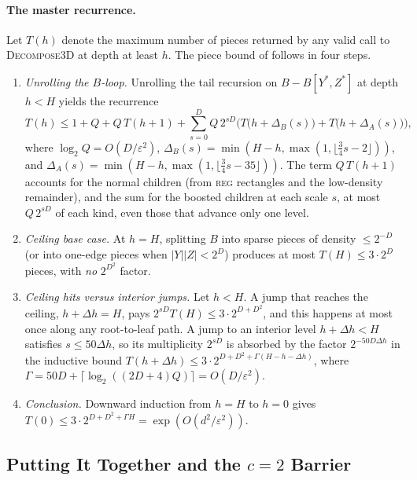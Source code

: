 \documentclass[11pt]{article}
\theoremstyle{definition}
\renewcommand{\label}[1]{}%
\newcommand{\abs}[1]{\left\lvert #1 \right\rvert}
\newcommand{\DecomposeThreeD}{\textnormal{\textsc{Decompose3D}}}
\newcommand{\tagreg}{\textnormal{\textsc{reg}}}
\begin{document}
\paragraph{The master recurrence.}
Let $T(h)$ denote the maximum number of pieces returned by any valid call to \DecomposeThreeD{} at depth at least $h$. The piece bound of  follows in four steps.
\begin{enumerate}[label=(\roman*), leftmargin=*]
    \item \emph{Unrolling the $B$-loop.} Unrolling the tail recursion on $B - B[Y^*, Z^*]$ at depth $h < H$ yields the recurrence
    \begin{equation}\label{eq:overview-recurrence}
        T(h) \le 1 + Q + Q\,T(h + 1) + \sum_{s=0}^{D} Q\,2^{s D}\Big(T\big(h + \Delta_B(s)\big) + T\big(h + \Delta_A(s)\big)\Big),
    \end{equation}
    where $\log_2 Q = O(D/\varepsilon^2)$, $\Delta_B(s) = \min(H-h, \max(1, \lfloor \frac{3}{4}s - 2 \rfloor))$, and $\Delta_A(s) = \min(H-h, \max(1, \lfloor \frac{3}{4}s - 35 \rfloor))$. The term $Q\,T(h+1)$ accounts for the normal children (from \tagreg{} rectangles and the low-density remainder), and the sum for the boosted children at each scale $s$, at most $Q\,2^{sD}$ of each kind, even those that advance only one level.
    \item \emph{Ceiling base case.} At $h = H$, splitting $B$ into sparse pieces of density $\le 2^{-D}$ (or into one-edge pieces when $\abs{Y}\abs{Z} < 2^D$) produces at most $T(H) \le 3 \cdot 2^D$ pieces, with \emph{no} $2^{D^2}$ factor.
    \item \emph{Ceiling hits versus interior jumps.} Let $h < H$. A jump that reaches the ceiling, $h + \Delta h = H$, pays $2^{s D} T(H) \le 3 \cdot 2^{D + D^2}$, and this happens at most once along any root-to-leaf path. A jump to an interior level $h + \Delta h < H$ satisfies $s \le 50\Delta h$, so its multiplicity $2^{s D}$ is absorbed by the factor $2^{-50 D \Delta h}$ in the inductive bound $T(h + \Delta h) \le 3 \cdot 2^{D + D^2 + \Gamma(H - h - \Delta h)}$, where $\Gamma = 50 D + \lceil \log_2((2D+4)Q) \rceil = O(D/\varepsilon^2)$.
    \item \emph{Conclusion.} Downward induction from $h = H$ to $h = 0$ gives $T(0) \le 3 \cdot 2^{D + D^2 + \Gamma H} = \exp(O(d^2 / \varepsilon^2))$.
\end{enumerate}

\subsection{Putting It Together and the \texorpdfstring{$c = 2$}{c = 2} Barrier}
\label{sec:overview-together}
\end{document}
